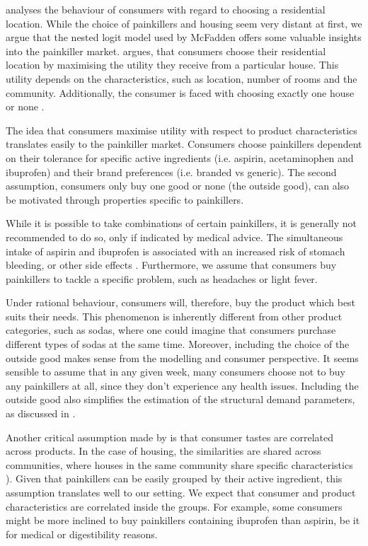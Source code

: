 \documentclass[12pt, authoryear]{elsarticle}
\begin{document}
\cite{mcfadden1978modeling} analyses the behaviour of consumers with regard to choosing a residential location. While the choice of painkillers and housing seem very distant at first, we argue that the nested logit model used by McFadden offers some valuable insights into the painkiller market. \cite{mcfadden1978modeling}  argues, that consumers choose their residential location by maximising the utility they receive from a particular house. This utility depends on the characteristics, such as location, number of rooms and the community. Additionally, the consumer is faced with choosing exactly one house or none \citep{mcfadden1978modeling}.

The idea that consumers maximise utility with respect to product characteristics translates easily to the painkiller market. Consumers choose painkillers dependent on their tolerance for specific active ingredients (i.e. aspirin, acetaminophen and ibuprofen) and their brand preferences (i.e. branded vs generic). The second assumption, consumers only buy one good or none (the outside good), can also be motivated through properties specific to painkillers.

While it is possible to take combinations of certain painkillers, it is generally not recommended to do so, only if indicated by medical advice. The simultaneous intake of aspirin and ibuprofen is associated with an increased risk of stomach bleeding, or other side effects  \citep{miller1981combination}. Furthermore, we assume that consumers buy painkillers to tackle a specific problem, such as headaches or light fever.

Under rational behaviour, consumers will, therefore, buy the product which best suits their needs. This phenomenon is inherently different from other product categories, such as sodas, where one could imagine that consumers purchase different types of sodas at the same time. Moreover, including the choice of the outside good makes sense from the modelling and consumer perspective. It seems sensible to assume that in any given week, many consumers choose not to buy any painkillers at all, since they don’t experience any health issues. Including the outside good also simplifies the estimation of the structural demand parameters, as discussed in \cite{berry1994estimating}.

Another critical assumption made by \cite{mcfadden1978modeling} is that consumer tastes are correlated across products. In the case of housing, the similarities are shared across communities, where houses in the same community share specific characteristics \citep{mcfadden1978modeling}). Given that painkillers can be easily grouped by their active ingredient, this assumption translates well to our setting. We expect that consumer and product characteristics are correlated inside the groups. For example, some consumers might be more inclined to buy painkillers containing ibuprofen than aspirin, be it for medical or digestibility reasons.
\end{document}
